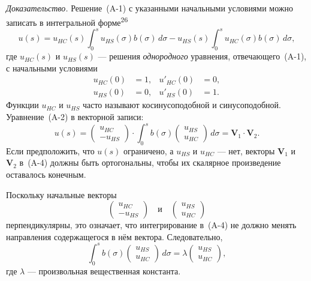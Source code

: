 \documentclass[11pt,a4paper]{article}
\begin{document}
\textit{Доказательство.} Решение~(A-1) с указанными начальными условиями можно
записать в интегральной форме\textsuperscript{26}
\begin{equation}
u(s)=u_{HC}(s)\int_0^s u_{HS}(\sigma)b(\sigma)\,d\sigma
-u_{HS}(s)\int_0^s u_{HC}(\sigma)b(\sigma)\,d\sigma,
\end{equation}
где $u_{HC}(s)$ и $u_{HS}(s)$ --- решения \emph{однородного} уравнения,
отвечающего~(A-1), с начальными условиями
\begin{equation}
\begin{aligned}
u_{HC}(0)&=1,& u'_{HC}(0)&=0,\\
u_{HS}(0)&=0,& u'_{HS}(0)&=1.
\end{aligned}
\end{equation}
Функции $u_{HC}$ и $u_{HS}$ часто называют косинусоподобной и синусоподобной.
Уравнение~(A-2) в векторной записи:
\begin{equation}
u(s)
=\begin{pmatrix}u_{HC}\\ -u_{HS}\end{pmatrix}
\cdot
\int_0^s b(\sigma)
\begin{pmatrix}u_{HS}\\ u_{HC}\end{pmatrix}\,d\sigma
=\mathbf{V}_1\cdot\mathbf{V}_2.
\end{equation}
Если предположить, что $u(s)$ ограничено, а $u_{HS}$ и $u_{HC}$ --- нет, векторы
$\mathbf{V}_1$ и $\mathbf{V}_2$ в~(A-4) должны быть ортогональны, чтобы их
скалярное произведение оставалось конечным.

Поскольку начальные векторы
\[
\begin{pmatrix}u_{HC}\\ -u_{HS}\end{pmatrix}
\quad\text{и}\quad
\begin{pmatrix}u_{HS}\\ u_{HC}\end{pmatrix}
\]
перпендикулярны, это означает, что интегрирование в~(A-4) не должно менять
направления содержащегося в нём вектора. Следовательно,
\begin{equation}
\int_0^s b(\sigma)
\begin{pmatrix}u_{HS}\\ u_{HC}\end{pmatrix}\,d\sigma
=\lambda
\begin{pmatrix}u_{HS}\\ u_{HC}\end{pmatrix},
\end{equation}
где $\lambda$ --- произвольная вещественная константа.
\end{document}

